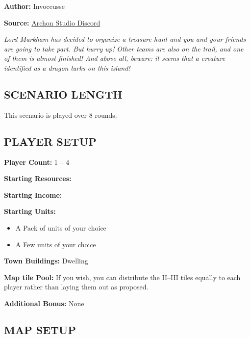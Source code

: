 
\begin{multicols*}{2}

\textbf{Author:} Invoceusse

\textbf{Source:} \href{https://discord.com/channels/740870068178649108/1222679455261261986}{Archon Studio Discord}

\textit{Lord Markham has decided to organize a treasure hunt and you and your friends are going to take part.
  But hurry up! Other teams are also on the trail, and one of them is almost finished!
  And above all, beware: it seems that a creature identified as a dragon lurks on this island!}
\subsection*{\MakeUppercase{Scenario Length}}

This scenario is played over 8 rounds.

\subsection*{\MakeUppercase{Player setup}}

\textbf{Player Count:} 1 -- 4

\textbf{Starting Resources:}\par
{}

\textbf{Starting Income:}\par
{}

\textbf{Starting Units:}
\begin{itemize}
  \item A Pack of  units of your choice
  \item A Few  units of your choice
\end{itemize}

\textbf{Town Buildings:}  Dwelling

\textbf{Map tile Pool:} If you wish, you can distribute the II--III tiles equally to each player rather than laying them out as proposed.

\textbf{Additional Bonus:} None

\subsection*{\MakeUppercase{Map Setup}}


\end{multicols*}
